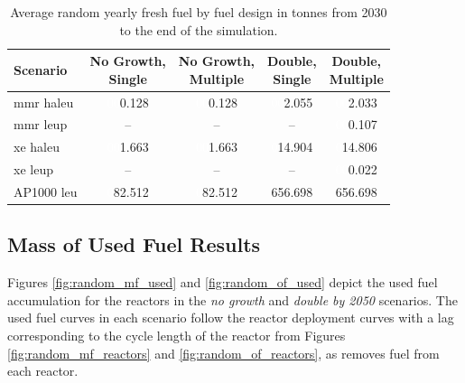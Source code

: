 \begin{table}[H]
    \centering
    \caption{Average random yearly fresh fuel by fuel design in tonnes from 2030 to the end of the simulation.}
    \label{tab:random_fresh_avg}
    \begin{tabular}{l c c c c}
       \toprule
       Scenario & \shortstack{No Growth,\\ Single} & \shortstack{No Growth,\\ Multiple} & \shortstack{Double,\\ Single} & \shortstack{Double,\\ Multiple}  \\
       \midrule
       \gls{mmr} \gls{haleu}   & \textcolor{white}{00}0.128    & \textcolor{white}{00}0.128   & \textcolor{white}{00}2.055    & \textcolor{white}{00}2.033    \\
       \gls{mmr} \gls{leup}    & --       & --      & --       & \textcolor{white}{00}0.107    \\
       \gls{xe} \gls{haleu}    & \textcolor{white}{00}1.663    & \textcolor{white}{00}1.663   & \textcolor{white}{0}14.904   & \textcolor{white}{0}14.806   \\
       \gls{xe} \gls{leup}     & --       & --      & --       & \textcolor{white}{00}0.022    \\
       AP1000 \gls{leu}        & \textcolor{white}{0}82.512   & \textcolor{white}{0}82.512  & 656.698  & 656.698  \\
       \bottomrule
    \end{tabular}
\end{table}





\subsection{Mass of Used Fuel Results}
\label{sec:random_used}

Figures \ref{fig:random_mf_used} and \ref{fig:random_of_used} depict the used fuel accumulation for the reactors in the \textit{no growth} and \textit{double by 2050} scenarios. The used fuel curves in each scenario follow the reactor deployment curves with a lag corresponding to the cycle length of the reactor from Figures \ref{fig:random_mf_reactors} and \ref{fig:random_of_reactors}, as \cyclus removes fuel from each reactor.


